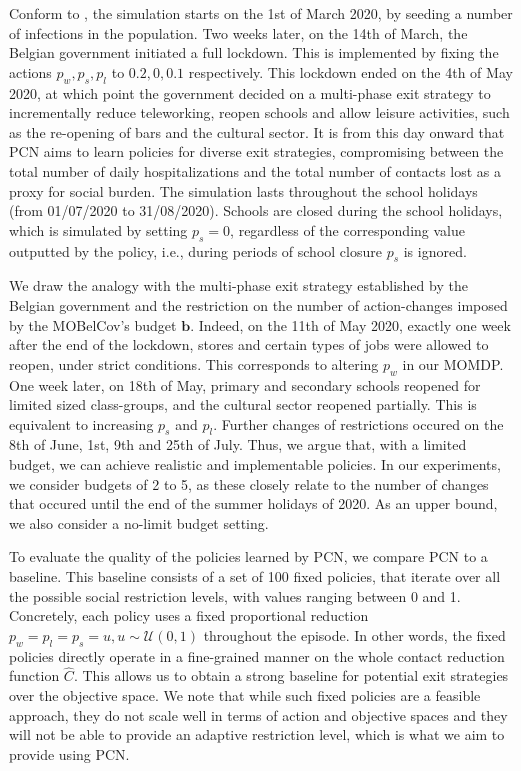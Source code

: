 \documentclass{article}
\newcommand{\momdpname}{MOBelCov}
\newcommand{\budget}{\bm{b}}
\begin{document}
Conform to \citet{abrams2021modelling}, the simulation starts on the 1st of March 2020, by seeding a number of infections in the population. Two weeks later, on the 14th of March, the Belgian government initiated a full lockdown. This is implemented by fixing the actions $p_w, p_s, p_l$ to $0.2, 0, 0.1$ respectively. This lockdown ended on the 4th of May 2020, at which point the government decided on a multi-phase exit strategy to incrementally reduce teleworking, reopen schools and allow leisure activities, such as the re-opening of bars and the cultural sector. It is from this day onward that PCN aims to learn policies for diverse exit strategies, compromising between the total number of daily hospitalizations and the total number of contacts lost as a proxy for social burden. The simulation lasts throughout the school holidays (from 01/07/2020 to 31/08/2020). Schools are closed during the school holidays, which is simulated by setting $p_s = 0$, regardless of the corresponding value outputted by the policy, i.e., during periods of school closure $p_s$ is ignored.

We draw the analogy with the multi-phase exit strategy established by the Belgian government and the restriction on the number of action-changes imposed by the \momdpname's budget $\budget$. Indeed, on the 11th of May 2020, exactly one week after the end of the lockdown, stores and certain types of jobs were allowed to reopen, under strict conditions. This corresponds to altering $p_w$ in our MOMDP. One week later, on 18th of May, primary and secondary schools reopened for limited sized class-groups, and the cultural sector reopened partially. This is equivalent to increasing $p_s$ and $p_l$. Further changes of restrictions occured on the 8th of June, 1st, 9th and 25th of July. Thus, we argue that, with a limited budget, we can achieve realistic and implementable policies. In our experiments, we consider budgets of 2 to 5, as these closely relate to the number of changes that occured until the end of the summer holidays of 2020. As an upper bound, we also consider a no-limit budget setting.

To evaluate the quality of the policies learned by PCN, we compare PCN to a baseline. This baseline consists of a set of 100 fixed policies, that iterate over all the possible social restriction levels, with values ranging between 0 and 1. Concretely, each policy uses a fixed proportional reduction $p_w=p_l=p_s=u, u\sim\mathcal{U}(0, 1)$ throughout the episode. In other words, the fixed policies directly operate in a fine-grained manner on the whole contact reduction function $\hat{C}$. This allows us to obtain a strong baseline for potential exit strategies over the objective space. We note that while such fixed policies are a feasible approach, they do not scale well in terms of action and objective spaces and they will not be able to provide an adaptive restriction level, which is what we aim to provide using PCN.
\end{document}
